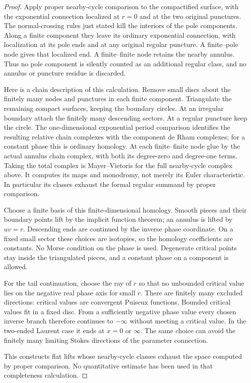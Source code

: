\documentclass[11pt]{article}
\theoremstyle{definition}\newtheorem{definition}[theorem]{Definition}
\theoremstyle{remark}\newtheorem{remark}[theorem]{Remark}
\begin{document}
\begin{proof}
Apply proper nearby-cycle comparison to the compactified surface,
with the exponential connection localized at $r=0$ and at the two
original punctures. The normal-crossing rules just stated kill the
interiors of the pole components. Along a finite component they leave
its ordinary exponential connection, with localization at its pole
ends and at any original regular puncture. A finite--pole node gives
that localized end. A finite--finite node retains the nearby annulus.
Thus no pole component is silently counted as an additional regular
class, and no annulus or puncture residue is discarded.

Here is a chain description of this calculation. Remove small discs
about the finitely many nodes and punctures in each finite component.
Triangulate the remaining compact surfaces, keeping the boundary
circles. At an irregular boundary attach the finitely many descending
sectors. At a regular puncture keep the circle. The one-dimensional
exponential period comparison identifies the resulting relative
chain complexes with the component de Rham complexes; for a constant
phase this is ordinary homology. At each finite--finite node glue by
the actual annulus chain complex, with both its degree-zero and
degree-one terms. Taking the total complex is Mayer--Vietoris for
the full nearby-cycle complex above. It computes its maps and
monodromy, not merely its Euler characteristic. In particular its
classes exhaust the formal regular summand by proper comparison.

Choose a finite basis of this finite-dimensional homology. Smooth
pieces and their boundary points lift by the implicit function
theorem; an annulus is lifted by $uv=r$. Descending ends are continued
by the inverse phase coordinate. On a fixed small sector these choices
are isotopies, so the homology coefficients are constants. No Morse
condition on the phase is used. Degenerate critical points stay
inside the triangulated pieces, and a constant phase on a component
is allowed.

For the tail continuation, choose the ray of $r$ so that no unbounded
critical value lies on the negative real phase axis for small $r$.
There are finitely many excluded directions: critical values are
convergent Puiseux functions. Bounded critical values fit in a fixed
disc. From a sufficiently negative phase value every chosen inverse
branch therefore continues to $-\infty$ without meeting a critical
value. In the two-ended Laurent case it ends at $x=0$ or $\infty$.
The same choice can avoid the finitely many limiting Stokes directions
of the parameter connection.

This constructs flat lifts whose nearby-cycle classes exhaust the
space computed by proper comparison. No quantitative estimate has
been used in that completeness calculation.
\end{proof}
\end{document}
